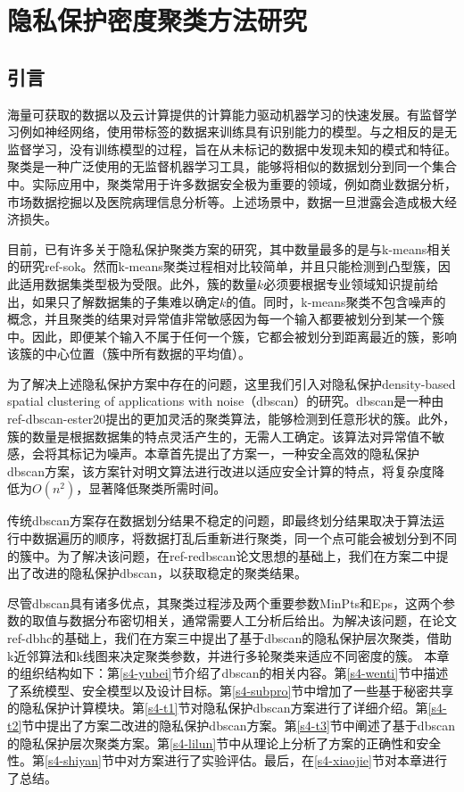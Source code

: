 \chapter{隐私保护密度聚类方法研究}
\section{引言}
海量可获取的数据以及云计算提供的计算能力驱动机器学习的快速发展。有监督学习例如神经网络，使用带标签的数据来训练具有识别能力的模型。与之相反的是无监督学习，没有训练模型的过程，旨在从未标记的数据中发现未知的模式和特征。聚类是一种广泛使用的无监督机器学习工具，能够将相似的数据划分到同一个集合中。实际应用中，聚类常用于许多数据安全极为重要的领域，例如商业数据分析，市场数据挖掘以及医院病理信息分析等。上述场景中，数据一旦泄露会造成极大经济损失。

目前，已有许多关于隐私保护聚类方案的研究，其中数量最多的是与k-means相关的研究ref-sok。然而k-means聚类过程相对比较简单，并且只能检测到凸型簇，因此适用数据集类型极为受限。此外，簇的数量$k$必须要根据专业领域知识提前给出，如果只了解数据集的子集难以确定$k$的值。同时，k-means聚类不包含噪声的概念，并且聚类的结果对异常值非常敏感因为每一个输入都要被划分到某一个簇中。因此，即便某个输入不属于任何一个簇，它都会被划分到距离最近的簇，影响该簇的中心位置（簇中所有数据的平均值）。

为了解决上述隐私保护方案中存在的问题，这里我们引入对隐私保护density-based spatial clustering of applications with noise（dbscan）的研究。dbscan是一种由ref-dbscan-ester20提出的更加灵活的聚类算法，能够检测到任意形状的簇。此外，簇的数量是根据数据集的特点灵活产生的，无需人工确定。该算法对异常值不敏感，会将其标记为噪声。本章首先提出了方案一，一种安全高效的隐私保护dbscan方案，该方案针对明文算法进行改进以适应安全计算的特点，将复杂度降低为$O(n^2)$，显著降低聚类所需时间。

传统dbscan方案存在数据划分结果不稳定的问题，即最终划分结果取决于算法运行中数据遍历的顺序，将数据打乱后重新进行聚类，同一个点可能会被划分到不同的簇中。为了解决该问题，在ref-redbscan论文思想的基础上，我们在方案二中提出了改进的隐私保护dbscan，以获取稳定的聚类结果。

尽管dbscan具有诸多优点，其聚类过程涉及两个重要参数MinPts和Eps，这两个参数的取值与数据分布密切相关，通常需要人工分析后给出。为解决该问题，在论文ref-dbhc的基础上，我们在方案三中提出了基于dbscan的隐私保护层次聚类，借助k近邻算法和k线图来决定聚类参数，并进行多轮聚类来适应不同密度的簇。
本章的组织结构如下：第\ref{s4-yubei}节介绍了dbscan的相关内容。第\ref{s4-wenti}节中描述了系统模型、安全模型以及设计目标。第\ref{s4-subpro}节中增加了一些基于秘密共享的隐私保护计算模块。第\ref{s4-t1}节对隐私保护dbscan方案进行了详细介绍。第\ref{s4-t2}节中提出了方案二改进的隐私保护dbscan方案。第\ref{s4-t3}节中阐述了基于dbscan的隐私保护层次聚类方案。第\ref{s4-lilun}节中从理论上分析了方案的正确性和安全性。第\ref{s4-shiyan}节中对方案进行了实验评估。最后，在\ref{s4-xiaojie}节对本章进行了总结。

